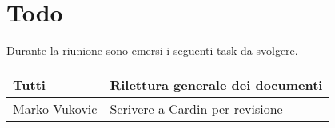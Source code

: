 \section{Todo}
Durante la riunione sono emersi i seguenti task da svolgere.

\begin{center}
  \begin{tabular}{|p{5cm}|p{7cm}|}
    \hline
    Tutti & Rilettura generale dei documenti  \\ \hline
    \hline
    Marko Vukovic & Scrivere a Cardin per revisione  \\ \hline
  \end{tabular}
\end{center}
